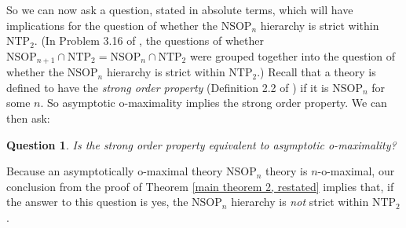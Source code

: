 \documentclass{amsart}
\newtheorem{question}[theorem]{Question}
\theoremstyle{definition}
\theoremstyle{remark}
\numberwithin{equation}{section}
\begin{document}
So we can now ask a question, stated in absolute terms, which will have implications for the question of whether the $\mathrm{NSOP}_{n}$ hierarchy is strict within $\mathrm{NTP}_{2}$. (In Problem 3.16 of \cite{Che14}, the questions of whether $\mathrm{NSOP}_{n+1} \cap \mathrm{NTP}_{2} = \mathrm{NSOP}_{n} \cap \mathrm{NTP}_{2}$ were grouped together into the question of whether the $\mathrm{NSOP}_{n}$ hierarchy is strict within $\mathrm{NTP}_{2}$.) Recall that a theory is defined to have the \textit{strong order property} (Definition 2.2 of \cite{She95}) if it is $\mathrm{NSOP}_{n}$ for some $n$. So asymptotic o-maximality implies the strong order property. We can then ask:

\begin{question}
    Is the strong order property equivalent to asymptotic o-maximality?
\end{question}

Because an asymptotically o-maximal theory $\mathrm{NSOP}_{n}$ theory is $n$-o-maximal, our conclusion from the proof of Theorem \ref{main theorem 2, restated} implies that, if the answer to this question is yes, the $\mathrm{NSOP}_{n}$ hierarchy is \textit{not} strict within $\mathrm{NTP}_{2}$.
\end{document}
